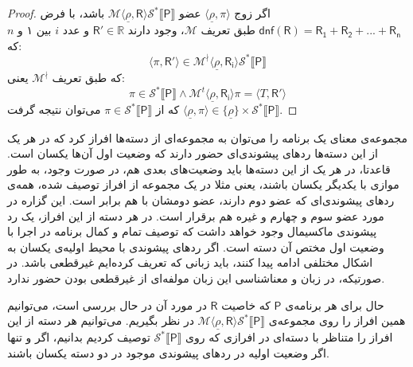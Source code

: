 \begin{proof}
	اگر زوج
	$\langle \underline{\rho}, \pi \rangle$ 
	عضو 
	$\mathcal{M}\langle \underline{\rho},\mathsf{R} \rangle \mathcal{S}^* \llbracket \mathsf{P} \rrbracket $
	باشد، با فرض 
	$\mathsf{dnf(R)=R_1+R_2+...+R_n}$
	طبق تعریف 
	$\mathcal{M}$،
	 وجود دارند $\mathsf{R'} \in \mathbb{R}$ و عدد $i$ بین ۱ و $n$ که: 
	$$\langle \pi , \mathsf{R'} \rangle \in \mathcal{M}^\nmid \langle \underline{\rho},\mathsf{R_i} \rangle \mathcal{S}^* \llbracket \mathsf{P} \rrbracket$$
	که طبق تعریف $\mathcal{M^\nmid}$ یعنی: 
	$$\pi \in \mathcal{S}^* \llbracket \mathsf{P} \rrbracket \land \mathcal{M}^t \langle \underline{\rho},\mathsf{R_i}\rangle \pi = \langle \mathit{T},\mathsf{R'} \rangle$$
که از 
$\pi \in \mathcal{S}^* \llbracket \mathsf{P} \rrbracket$
می‌توان نتیجه گرفت 
$\langle \underline{\rho}, \pi \rangle \in \{\underline{\rho}\} \times \mathcal{S}^* \llbracket \mathsf{P} \rrbracket$.

\end{proof}


مجموعه‌ی معنای یک برنامه را می‌توان به مجموعه‌ای از دسته‌ها افراز کرد که در هر یک از این دسته‌ها ردهای پیشوندی‌ای حضور دارند که وضعیت اول آن‌ها یکسان است. قاعدتا، در هر یک از این دسته‌ها باید وضعیت‌های بعدی هم، در صورت وجود، به طور موازی با یکدیگر یکسان باشند، یعنی مثلا در یک مجموعه از افراز توصیف شده، همه‌ی ردهای پیشوندی‌ای که عضو دوم دارند، عضو دومشان با هم برابر است. این گزاره در مورد عضو سوم و چهارم و غیره هم برقرار است. در هر دسته از این افراز، یک رد پیشوندی ماکسیمال وجود خواهد داشت که توصیف تمام و کمال برنامه در اجرا با وضعیت اول مختص آن دسته است.
اگر ردهای پیشوندی با محیط اولیه‌ی یکسان به اشکال مختلفی ادامه پیدا کنند، باید زبانی که تعریف کرده‌ایم غیرقطعی باشد. در صورتیکه، در زبان و معناشناسی این زبان مولفه‌ای از غیرقطعی بودن حضور ندارد.

حال برای هر برنامه‌ی $\mathsf{P}$ که خاصیت $\mathsf{R}$ در مورد آن در حال بررسی است، می‌توانیم همین افراز را روی مجموعه‌ی 
$\mathcal{M} \langle \underline{\rho}, \mathsf{R} \rangle \mathcal{S}^* \llbracket \mathsf{P} \rrbracket$
در نظر بگیریم. می‌توانیم هر دسته از این افراز را متناظر با دسته‌ای در افرازی که روی 
$\mathcal{S}^* \llbracket \mathsf{P}\rrbracket$ 
توصیف کردیم بدانیم، اگر و تنها اگر وضعیت اولیه در ردهای پیشوندی موجود در دو دسته یکسان باشند.

